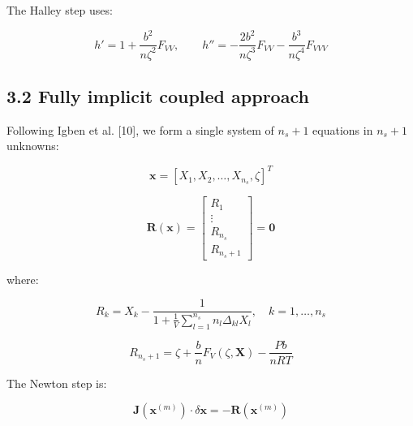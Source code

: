 \documentclass[review,3p]{elsarticle}
\begin{document}
The Halley step uses:

\begin{equation}

h' = 1 + \frac{b^2}{n\zeta^2} F_{VV}, \qquad h'' = -\frac{2b^2}{n\zeta^3} F_{VV} - \frac{b^3}{n\zeta^4} F_{VVV}

\end{equation}

\subsection{3.2 Fully implicit coupled approach}

Following Igben et al. [10], we form a single system of $n_s + 1$ equations in $n_s + 1$ unknowns:

\begin{equation}

\mathbf{x} = [X_1, X_2, \ldots, X_{n_s}, \zeta]^T

\end{equation}

\begin{equation}

\mathbf{R}(\mathbf{x}) = \begin{bmatrix} R_1 \\ \vdots \\ R_{n_s} \\ R_{n_s+1} \end{bmatrix} = \mathbf{0}

\end{equation}

where:

\begin{equation}

R_k = X_k - \frac{1}{1 + \displaystyle\frac{1}{V}\sum_{l=1}^{n_s} n_l \Delta_{kl} X_l}, \quad k = 1, \ldots, n_s

\end{equation}

\begin{equation}

R_{n_s+1} = \zeta + \frac{b}{n} F_V(\zeta, \mathbf{X}) - \frac{Pb}{nRT}

\end{equation}

The Newton step is:

\begin{equation}

\mathbf{J}(\mathbf{x}^{(m)}) \cdot \delta\mathbf{x} = -\mathbf{R}(\mathbf{x}^{(m)})

\end{equation}
\end{document}

